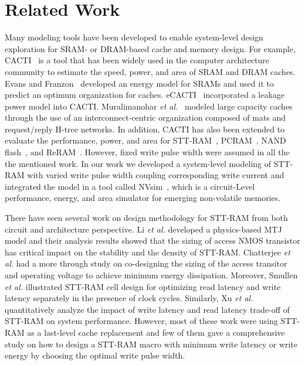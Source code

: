 \section{Related Work} \label{sec:relate}

Many modeling tools have been developed to enable system-level design exploration for SRAM- or DRAM-based cache and memory design.  For example, CACTI~\cite{CACTI51} is a tool that has been widely used in the computer architecture community to estimate the speed, power, and area of SRAM and DRAM caches.  Evans and Franzon~\cite{CACTI:JSSC95:Evans} developed an energy model for SRAMs and used it to predict an optimum organization for caches.  eCACTI~\cite{eCACTI} incorporated a leakage power model into CACTI.  Muralimanohar \emph{et al.}~\cite{CACTI60} modeled large capacity caches through the use of an interconnect-centric organization composed of mats and request/reply H-tree networks. In addition, CACTI has also been extended to evaluate the performance, power, and area for STT-RAM~\cite{CACTI:DAC08:Dong}, PCRAM~\cite{CACTI:PCRAMsim}, NAND flash~\cite{CACTI:DATE10:Mohan}, and ReRAM~\cite{CACTI:DATE11:Xu}. However, fixed write pulse width were assumed in all the the mentioned work. In our work we developed a system-level modeling of STT-RAM with varied write pulse width coupling corresponding write current and integrated the model in a tool called NVsim~\cite{CACTI:PCRAMsim}, which is a circuit-Level performance, energy, and area simulator for emerging non-volatile memories.

There have seen several work on design methodology for STT-RAM from both circuit and architecture perspective. Li \emph{et al.} developed a physics-based MTJ model and their analysis results showed that the sizing of access NMOS transistor has critical impact on the stability and the density of STT-RAM. Chatterjee \emph{et al.} had a more  through study on co-designing the sizing of the access transitor and operating voltage to achieve minimum energy dissipation. Moreover, Smullen \emph{et al.} illustrated STT-RAM cell design for optimizing read latency and write latency separately in the presence of clock cycles. Similarly, Xu \emph{et al.} quantitatively analyze the impact of write latency and read latency trade-off of STT-RAM on system performance. However, most of these work were using STT-RAM as a last-level cache replacement and few of them gave a comprehensive study on how to design a STT-RAM macro with minimum write latency or write energy by choosing the optimal write pulse width.

